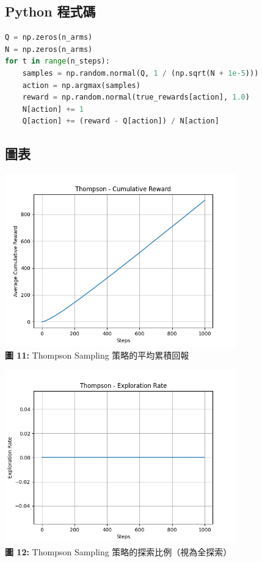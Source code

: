 \documentclass{article}
\begin{document}
\subsection*{Python 程式碼}
\begin{lstlisting}[language=Python]
Q = np.zeros(n_arms)
N = np.zeros(n_arms)
for t in range(n_steps):
    samples = np.random.normal(Q, 1 / (np.sqrt(N + 1e-5)))
    action = np.argmax(samples)
    reward = np.random.normal(true_rewards[action], 1.0)
    N[action] += 1
    Q[action] += (reward - Q[action]) / N[action]
\end{lstlisting}

\subsection*{圖表}
\begin{center}
\includegraphics[width=0.75\textwidth]{./plots/thompson_reward.png} \\
\textbf{圖 11:} Thompson Sampling 策略的平均累積回報
\end{center}

\begin{center}
\includegraphics[width=0.75\textwidth]{./plots/thompson_explore.png} \\
\textbf{圖 12:} Thompson Sampling 策略的探索比例（視為全探索）
\end{center}
\end{document}
